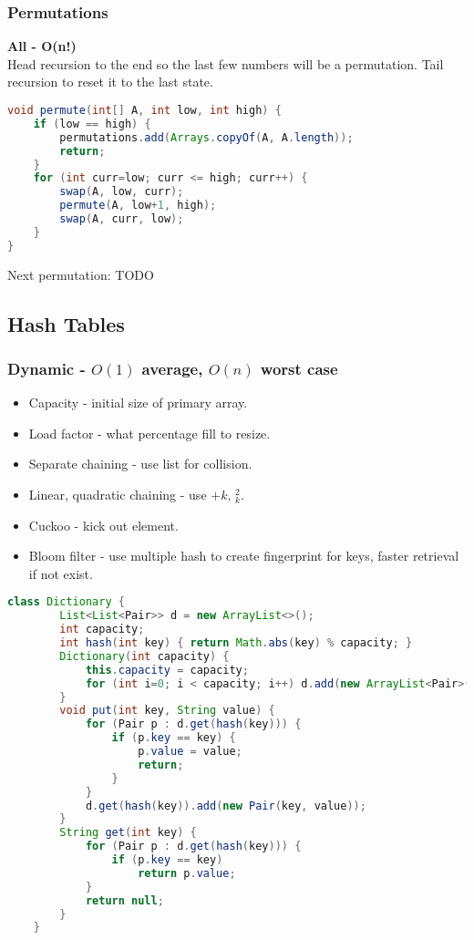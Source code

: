 \documentclass[10pt]{article}
\begin{document}
\subsubsection{Permutations}
\textbf{All - O(n!)}\\
Head recursion to the end so the last few numbers will be a permutation. Tail recursion to reset it to the last state.
\begin{lstlisting}[language=java]
void permute(int[] A, int low, int high) {
    if (low == high) {
        permutations.add(Arrays.copyOf(A, A.length));
        return;
    }
    for (int curr=low; curr <= high; curr++) {
        swap(A, low, curr);
        permute(A, low+1, high);
        swap(A, curr, low);
    }
}
\end{lstlisting}
Next permutation: TODO

\subsection{Hash Tables}
\subsubsection{Dynamic - $O(1)$ average, $O(n)$ worst case}
\begin{itemize}
    \itemsep0em
    \item Capacity - initial size of primary array.
    \item Load factor - what percentage fill to resize.
    \item Separate chaining - use list for collision.
    \item Linear, quadratic chaining - use $+k$, $_k^2$.
    \item Cuckoo - kick out element.
    \item Bloom filter - use multiple hash to create fingerprint for keys, faster retrieval if not exist.
\end{itemize}
\begin{lstlisting}[language=java]
    class Dictionary {
        List<List<Pair>> d = new ArrayList<>();
        int capacity;
        int hash(int key) { return Math.abs(key) % capacity; }
        Dictionary(int capacity) {
            this.capacity = capacity;
            for (int i=0; i < capacity; i++) d.add(new ArrayList<Pair>());
        }
        void put(int key, String value) {
            for (Pair p : d.get(hash(key))) {
                if (p.key == key) {
                    p.value = value;
                    return;
                }
            }
            d.get(hash(key)).add(new Pair(key, value));
        }
        String get(int key) {
            for (Pair p : d.get(hash(key))) {
                if (p.key == key)
                    return p.value;
            }
            return null;
        }
    }
\end{lstlisting}
\end{document}
